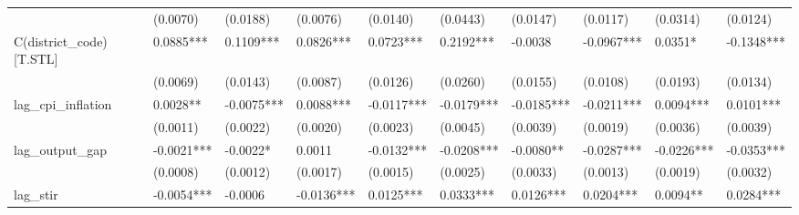\begin{table}
\begin{center}
\begin{tabular}{llllllllll}
                         & (0.0070)               & (0.0188)                & (0.0076)                 & (0.0140)                    & (0.0443)                     & (0.0147)                      & (0.0117)                   & (0.0314)                    & (0.0124)                      \\
C(district\_code)[T.STL] & 0.0885***              & 0.1109***               & 0.0826***                & 0.0723***                   & 0.2192***                    & -0.0038                       & -0.0967***                 & 0.0351*                     & -0.1348***                    \\
                         & (0.0069)               & (0.0143)                & (0.0087)                 & (0.0126)                    & (0.0260)                     & (0.0155)                      & (0.0108)                   & (0.0193)                    & (0.0134)                      \\
lag\_cpi\_inflation      & 0.0028**               & -0.0075***              & 0.0088***                & -0.0117***                  & -0.0179***                   & -0.0185***                    & -0.0211***                 & 0.0094***                   & 0.0101***                     \\
                         & (0.0011)               & (0.0022)                & (0.0020)                 & (0.0023)                    & (0.0045)                     & (0.0039)                      & (0.0019)                   & (0.0036)                    & (0.0039)                      \\
lag\_output\_gap         & -0.0021***             & -0.0022*                & 0.0011                   & -0.0132***                  & -0.0208***                   & -0.0080**                     & -0.0287***                 & -0.0226***                  & -0.0353***                    \\
                         & (0.0008)               & (0.0012)                & (0.0017)                 & (0.0015)                    & (0.0025)                     & (0.0033)                      & (0.0013)                   & (0.0019)                    & (0.0032)                      \\
lag\_stir                & -0.0054***             & -0.0006                 & -0.0136***               & 0.0125***                   & 0.0333***                    & 0.0126***                     & 0.0204***                  & 0.0094**                    & 0.0284***                     \\

\end{tabular}
\end{center}
\end{table}
